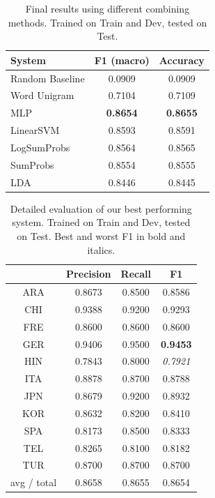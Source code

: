 \documentclass[11pt,letterpaper]{article}
\begin{document}
\begin{table}[h!]
\center
\begin{tabular}{|l|cc|}
\hline
\bf System & \bf F1 (macro) & \bf Accuracy \\
\hline
Random Baseline & 0.0909 & 0.0909 \\
Word Unigram & 0.7104 & 0.7109 \\
\hline
MLP & \bf 0.8654 & \bf 0.8655 \\
LinearSVM & 0.8593 & 0.8591 \\
LogSumProbs & 0.8564 & 0.8565 \\
SumProbs & 0.8554 & 0.8555 \\
LDA & 0.8446 & 0.8445 \\
\hline
\end{tabular}
\caption{Final results using different combining methods. Trained on Train and Dev, tested on Test.}
\label{tab:results-2}
\end{table}

\begin{table}[h!]
\center
\begin{tabular}{|c|ccc|}
\hline
& \bf Precision & \bf Recall & \bf F1 \\
\hline
        ARA  &   0.8673  &  0.8500  &  0.8586       \\
        CHI  &   0.9388  & 0.9200  &  0.9293       \\
        FRE   &  0.8600  &  0.8600  &  0.8600       \\
        GER   &  0.9406  &  0.9500   & \bf 0.9453       \\
        HIN   &  0.7843  &  0.8000  &  \textit{0.7921}       \\
        ITA   &  0.8878  &  0.8700  &  0.8788       \\
        JPN   &  0.8679  &  0.9200  &  0.8932       \\
        KOR  &   0.8632  &  0.8200  &  0.8410       \\
        SPA   &  0.8173  &  0.8500  &  0.8333       \\
        TEL   &  0.8265   & 0.8100  &  0.8182     \\
        TUR   &  0.8700  &  0.8700  &  0.8700   \\
\hline
avg / total   &  0.8658  &  0.8655  &  0.8654 \\
\hline
\end{tabular}
\caption{Detailed evaluation of our best performing system. Trained on Train and Dev, tested on Test. Best and worst F1 in bold and italics.}
\label{tab:results-3}
\end{table}
\end{document}
